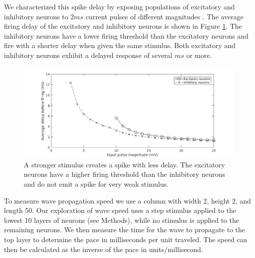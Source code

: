 \documentclass[a4paper,11pt]{article}
\begin{document}
We characterized this spike delay by exposing populations of excitatory and inhibitory neurons to $2 ms$ current pulses of different magnitudes \cite{izhikevich}.
The average firing delay of the excitatory and inhibitory neurons is shown in Figure \ref{fig:delay_neurondynamics}.
The inhibitory neurons have a lower firing threshold than the excitatory neurons and fire with a shorter delay when given the same stimulus.
Both excitatory and inhibitory neurons exhibit a delayed response of several $ms$ or more.
\begin{figure}[!htb]
 \caption{ A stronger stimulus creates a spike with less delay. The excitatory neurons have a higher firing threshold than the inhibitory neurons and do not emit a spike for very weak stimulus.}
 \label{fig:delay_neurondynamics}
 \centering
   \includegraphics[width=\textwidth]{fig/WaveSpeed_NeuronDynamics}
\end{figure}

To measure wave propagation speed we use a column with width 2, height 2, and length 50.
Our exploration of wave speed uses a step stimulus applied to the lowest 10 layers of neurons (see Methods), while no stimulus is applied to the remaining neurons.
We then measure the time for the wave to propagate to the top layer to determine the pace in milliseconds per unit traveled.
The speed can then be calculated as the inverse of the pace in units/millisecond.
\end{document}
